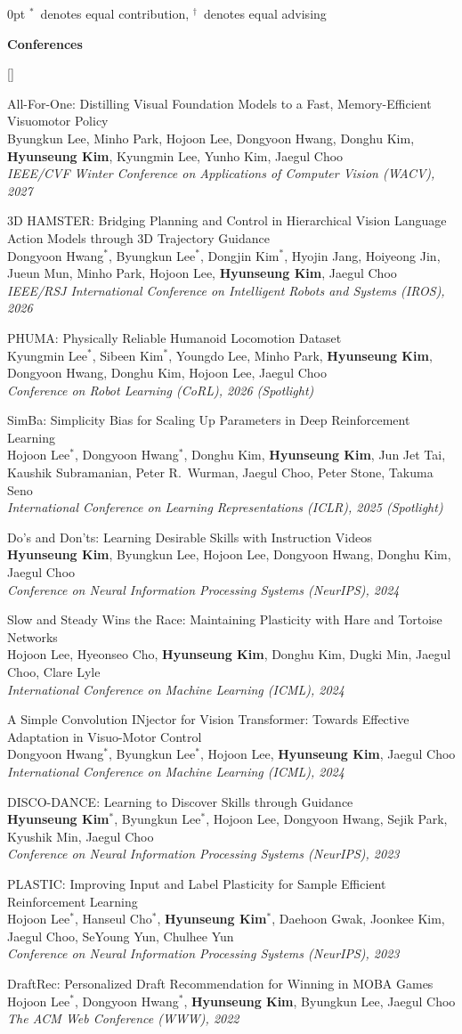 \documentclass[11pt,letterpaper]{article}
\newlength{\labelw}\setlength{\labelw}{1.15in}
\newenvironment{cvsection}[1]
  {\par\addvspace{14pt}
   \begin{adjustwidth}{\labelw}{0pt}
   \noindent\llap{\smash{\parbox[t]{\labelw}{\raggedright\textsc{#1}}}}\ignorespaces}
  {\end{adjustwidth}}
\newcommand{\me}{\textbf{Hyunseung Kim}}
\newcommand{\sub}[1]{\par\medskip\textbf{#1}\par\smallskip}
\newcommand{\eq}{$^{*}$}
\newcommand{\adv}{$^{\dagger}$}
\newcounter{pub}
\newenvironment{pubs}
  {\begin{list}{[\arabic{pub}]}{\usecounter{pub}\setlength{\leftmargin}{2.2em}\setlength{\itemsep}{4pt}\setlength{\parsep}{0pt}\setlength{\topsep}{2pt}}}
  {\end{list}}
\newcommand{\pub}[3]{\item #1\\#2\\\textit{#3}}
\begin{document}
\begin{cvsection}{Publications}
\eq\ denotes equal contribution, \adv\ denotes equal advising

\sub{Conferences}
\begin{pubs}
\pub{All-For-One: Distilling Visual Foundation Models to a Fast, Memory-Efficient Visuomotor Policy}
    {Byungkun Lee, Minho Park, Hojoon Lee, Dongyoon Hwang, Donghu Kim, \me, Kyungmin Lee, Yunho Kim, Jaegul Choo}
    {IEEE/CVF Winter Conference on Applications of Computer Vision (WACV), 2027}
\pub{3D HAMSTER: Bridging Planning and Control in Hierarchical Vision Language Action Models through 3D Trajectory Guidance}
    {Dongyoon Hwang\eq, Byungkun Lee\eq, Dongjin Kim\eq, Hyojin Jang, Hoiyeong Jin, Jueun Mun, Minho Park, Hojoon Lee, \me, Jaegul Choo}
    {IEEE/RSJ International Conference on Intelligent Robots and Systems (IROS), 2026}
\pub{PHUMA: Physically Reliable Humanoid Locomotion Dataset}
    {Kyungmin Lee\eq, Sibeen Kim\eq, Youngdo Lee, Minho Park, \me, Dongyoon Hwang, Donghu Kim, Hojoon Lee, Jaegul Choo}
    {Conference on Robot Learning (CoRL), 2026 \textup{(Spotlight)}}
\pub{SimBa: Simplicity Bias for Scaling Up Parameters in Deep Reinforcement Learning}
    {Hojoon Lee\eq, Dongyoon Hwang\eq, Donghu Kim, \me, Jun Jet Tai, Kaushik Subramanian, Peter R.\ Wurman, Jaegul Choo, Peter Stone, Takuma Seno}
    {International Conference on Learning Representations (ICLR), 2025 \textup{(Spotlight)}}
\pub{Do's and Don'ts: Learning Desirable Skills with Instruction Videos}
    {\me, Byungkun Lee, Hojoon Lee, Dongyoon Hwang, Donghu Kim, Jaegul Choo}
    {Conference on Neural Information Processing Systems (NeurIPS), 2024}
\pub{Slow and Steady Wins the Race: Maintaining Plasticity with Hare and Tortoise Networks}
    {Hojoon Lee, Hyeonseo Cho, \me, Donghu Kim, Dugki Min, Jaegul Choo, Clare Lyle}
    {International Conference on Machine Learning (ICML), 2024}
\pub{A Simple Convolution INjector for Vision Transformer: Towards Effective Adaptation in Visuo-Motor Control}
    {Dongyoon Hwang\eq, Byungkun Lee\eq, Hojoon Lee, \me, Jaegul Choo}
    {International Conference on Machine Learning (ICML), 2024}
\pub{DISCO-DANCE: Learning to Discover Skills through Guidance}
    {\me\eq, Byungkun Lee\eq, Hojoon Lee, Dongyoon Hwang, Sejik Park, Kyushik Min, Jaegul Choo}
    {Conference on Neural Information Processing Systems (NeurIPS), 2023}
\pub{PLASTIC: Improving Input and Label Plasticity for Sample Efficient Reinforcement Learning}
    {Hojoon Lee\eq, Hanseul Cho\eq, \me\eq, Daehoon Gwak, Joonkee Kim, Jaegul Choo, SeYoung Yun, Chulhee Yun}
    {Conference on Neural Information Processing Systems (NeurIPS), 2023}
\pub{DraftRec: Personalized Draft Recommendation for Winning in MOBA Games}
    {Hojoon Lee\eq, Dongyoon Hwang\eq, \me, Byungkun Lee, Jaegul Choo}
    {The ACM Web Conference (WWW), 2022}
\end{pubs}


\end{cvsection}
\end{document}
